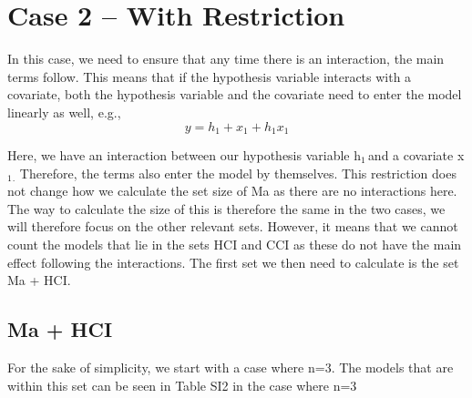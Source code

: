 \section{Case 2 – With Restriction}

In this case, we need to ensure that any time there is an interaction, the main terms follow. This means that if the hypothesis variable interacts with a covariate, both the hypothesis variable and the covariate need to enter the model linearly as well, e.g.,
\[y=h_1+x_1+h_1x_1\] 

Here, we have an interaction between our hypothesis variable h${}_{1\ }$and a covariate x${}_{1}$${}_{.}$ Therefore, the terms also enter the model by themselves. This restriction does not change how we calculate the set size of Ma as there are no interactions here. The way to calculate the size of this is therefore the same in the two cases, we will therefore focus on the other relevant sets. However, it means that we cannot count the models that lie in the sets HCI and CCI as these do not have the main effect following the interactions. The first set we then need to calculate is the set Ma + HCI.

\subsection{Ma + HCI}
For the sake of simplicity, we start with a case where n=3. The models that are within this set can be seen in Table SI2 in the case where n=3 \\

